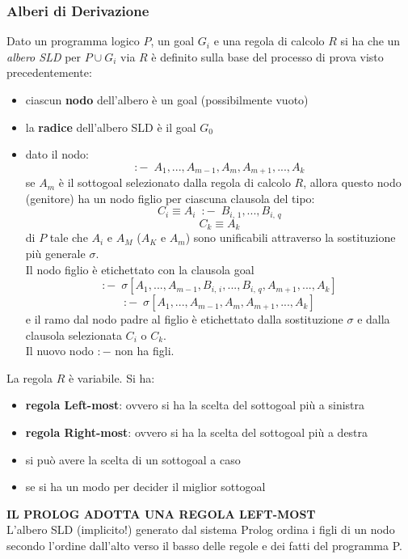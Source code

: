 \documentclass[a4paper,12pt, oneside]{book}
\begin{document}
\subsubsection{Alberi di Derivazione}
Dato un programma logico $P$, un goal $G_i$ e una regola di calcolo $R$ si ha che un \textit{albero SLD} per $P\cup G_i$ via $R$ è definito sulla base del processo di prova visto precedentemente:
\begin{itemize}
\item ciascun \textbf{nodo} dell'albero è un goal (possibilmente vuoto)
\item la \textbf{radice }dell'albero SLD è il goal $G_0$
\item dato il nodo:
$$:-\,\,\, A_1,...,A_{m-1},A_m,A_{m+1},...,A_k$$
se $A_m$ è il sottogoal selezionato dalla regola di calcolo $R$, allora questo nodo (genitore) ha un nodo figlio per ciascuna clausola del tipo:
$$C_i\equiv A_i\,\,\, :-\,\,\, B_{i,\,1},...,B_{i,\,q}$$
$$C_k\equiv A_k$$
di $P$ tale che $A_i$ e $A_M$ ($A_K$ e $A_m$) sono unificabili attraverso la sostituzione più generale $\sigma$.\\
Il nodo figlio è etichettato con la clausola goal
$$:-\,\,\,\sigma[A_1,...,A_{m-1},B_{i,\,i},...,B_{i,\,q},A_{m+1},...,A_k]$$
$$:-\,\,\,\sigma[A_1,...,A_{m-1},A_m,A_{m+1},...,A_k]$$
e il ramo dal nodo padre al figlio è etichettato dalla sostituzione $\sigma$ e dalla clausola selezionata $C_i$ o $C_k$.\\
Il nuovo nodo $:-$ non ha figli.
\end{itemize}
La regola $R$ è variabile. Si ha:
\begin{itemize}
\item \textbf{regola Left-most}: ovvero si ha la scelta del sottogoal più a sinistra 
\item \textbf{regola Right-most}: ovvero si ha la scelta del sottogoal più a destra
\item si può avere la scelta di un sottogoal a caso
\item se si ha un modo per decider il miglior sottogoal  
\end{itemize}
\textbf{IL PROLOG ADOTTA UNA REGOLA LEFT-MOST}
\\
L'albero SLD (implicito!) generato dal sistema Prolog ordina i figli di un nodo secondo l'ordine dall'alto verso il basso delle regole e dei fatti del programma P. 
\end{document}

